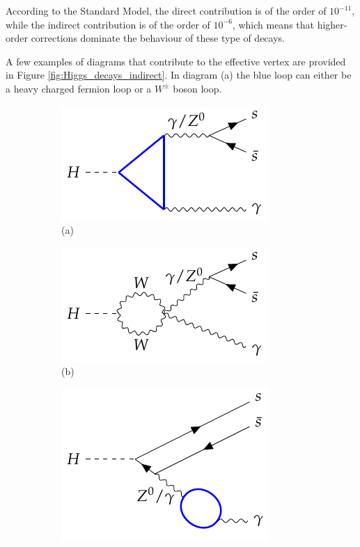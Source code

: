 According to the Standard Model, the direct contribution is of the order of $10^{-11}$, while the indirect contribution is of the order of $10^{-6}$, which means that higher-order corrections dominate the behaviour of these type of decays.

A few examples of diagrams that contribute to the effective vertex are provided in Figure \ref{fig:Higgs_decays_indirect}. In diagram (a) the blue loop can either be a heavy charged fermion loop or a $W^{\pm}$ boson loop.

\begin{figure}[!ht]
    \captionsetup[subfigure]{labelformat=empty}
    \vspace*{-0.2cm}
    \centering
    \setlength{\mylength}{\textwidth}
    \begin{subfigure}[t]{0.333\mylength}
            \centering
            \includegraphics[width=0.323\mylength]{resources/H_rare_indirect/v1.pdf}%
            \caption{\footnotesize (a)}
    \end{subfigure}%
    \begin{subfigure}[t]{0.333\mylength}
            \centering
            \includegraphics[width=0.323\mylength]{resources/H_rare_indirect/v2.pdf}%
            \caption{\footnotesize (b)}
    \end{subfigure}%
    \begin{subfigure}[t]{0.333\mylength}
            \centering
            \includegraphics[width=0.323\mylength]{resources/H_rare_indirect/v4.pdf}%

\end{subfigure}
\end{figure}
